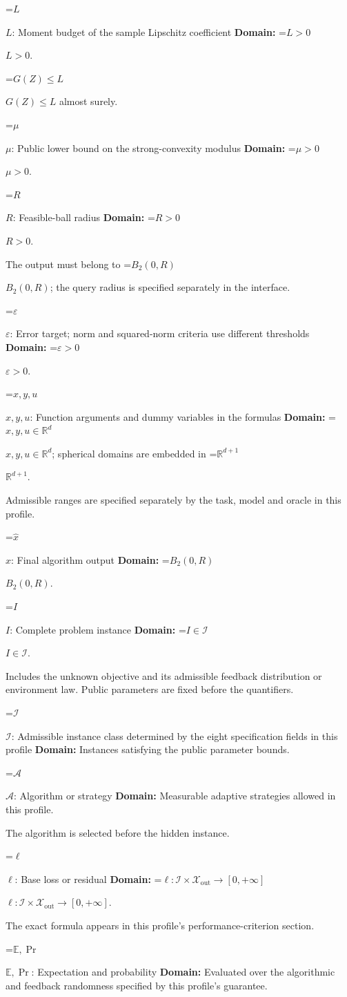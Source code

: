 \documentclass[10pt,a4paper]{article}
\newcommand{\AtlasMath}[1]{\par\begingroup\centering\setbox0=\hbox{$\displaystyle #1$}\ifdim\wd0>1.4\linewidth\typeout{ATLAS WIDE FORMULA: \the\wd0}\fi\ifdim\wd0>\linewidth\resizebox{\linewidth}{!}{\box0}\else\box0\fi\par\endgroup}
\newcommand{\AtlasInlineMath}[1]{\begingroup\setbox0=\hbox{$#1$}\ifdim\wd0>.4\linewidth\endgroup\AtlasMath{#1}\else\endgroup$#1$\fi}
\begin{document}
\AtlasInlineMath{L}: Moment budget of the sample Lipschitz coefficient \textbf{Domain:} \AtlasInlineMath{L>0}.

\AtlasInlineMath{G(Z)\le L} almost surely.

\AtlasInlineMath{\mu}: Public lower bound on the strong-convexity modulus \textbf{Domain:} \AtlasInlineMath{\mu>0}.

\AtlasInlineMath{R}: Feasible-ball radius \textbf{Domain:} \AtlasInlineMath{R>0}.

The output must belong to \AtlasInlineMath{B_2(0,R)}; the query radius is specified separately in the interface.

\AtlasInlineMath{\varepsilon}: Error target; norm and squared-norm criteria use different thresholds \textbf{Domain:} \AtlasInlineMath{\varepsilon>0}.

\AtlasInlineMath{x,y,u}: Function arguments and dummy variables in the formulas \textbf{Domain:} \AtlasInlineMath{x,y,u\in\mathbb{R}^d}; spherical domains are embedded in \AtlasInlineMath{\mathbb{R}^{d+1}}.

Admissible ranges are specified separately by the task, model and oracle in this profile.

\AtlasInlineMath{\widehat{x}}: Final algorithm output \textbf{Domain:} \AtlasInlineMath{B_2(0,R)}.

\AtlasInlineMath{I}: Complete problem instance \textbf{Domain:} \AtlasInlineMath{I\in\mathcal{I}}.

Includes the unknown objective and its admissible feedback distribution or environment law. Public parameters are fixed before the quantifiers.

\AtlasInlineMath{\mathcal{I}}: Admissible instance class determined by the eight specification fields in this profile \textbf{Domain:} Instances satisfying the public parameter bounds.

\AtlasInlineMath{\mathcal{A}}: Algorithm or strategy \textbf{Domain:} Measurable adaptive strategies allowed in this profile.

The algorithm is selected before the hidden instance.

\AtlasInlineMath{\ell}: Base loss or residual \textbf{Domain:} \AtlasInlineMath{\ell:\mathcal{I}\times\mathcal{X}_{\mathrm{out}}\to[0,+\infty]}.

The exact formula appears in this profile's performance-criterion section.

\AtlasInlineMath{\mathbb{E},\Pr}: Expectation and probability \textbf{Domain:} Evaluated over the algorithmic and feedback randomness specified by this profile's guarantee.
\end{document}
